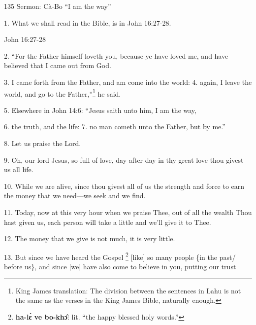 
135 Sermon: Cà-Bo ``I am the way''

1. What we shall read in the Bible, is in John 16:27-28.

John 16:27-28

2. ``For the Father himself loveth you, because ye have loved me, and have believed
that I came out from God.

3. I came forth from the Father, and am come into the world: 4. again, I leave
the world, and go to the Father,''\footnote{King James translation: The division between the sentences in Lahu is not the same as the verses in the King James Bible, naturally enough.} he said.

5. Elsewhere in John 14:6: ``Jesus saith unto him, I am the way,

6. the truth, and the life: 7. no man cometh unto the Father, but by me.''

8. Let us praise the Lord.

9. Oh, our lord Jesus, so full of love, day after day in thy great love thou givest
us all life.

10. While we are alive, since thou givest all of us the strength and force to earn
the money that we need---we seek and we find.

11. Today, now at this very hour when we praise Thee, out of all the wealth Thou
hast given us, each person will take a little and we'll give it to Thee.

12. The money that we give is not much, it is very little.

13. But since we have heard the Gospel \footnote{\textbf{ha-lɛ̀ ve bo-khɔ̂}: lit. ``the happy blessed holy words.''} [like] so many people \{in the past/
before us\}, and since [we] have also come to believe in you, putting our trust
